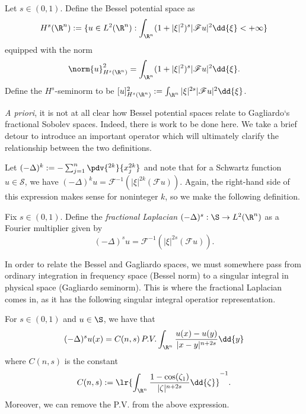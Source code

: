 \documentclass[../main.tex]{subfiles}
\begin{document}
\begin{definition}
    Let $ s\in (0,1) $. Define the Bessel potential space as
    \[
         H^{s}(\R^{n}) := \{ u\in L^{2}(\R^{n}): \int_{\R^{n}}(1+| \xi|^{2})^{s}|\mathscr{F}u|^{2}\dd{\xi} < +\infty\} 
    \]
    equipped with the norm
    \[
        \norm{u}_{H^{s}(\R^{n})}^{2} = \int_{\R^{n}}(1+| \xi|^{2})^{s}|\mathscr{F}u|^{2}\dd{\xi}.
    \]
    Define the $ H^{s} $-seminorm to be $ [u]_{H^{s}(\R^{n})}^{2}:= \int_{\R^{n}}| \xi|^{2s}|\mathscr{F}u|^{2}\dd{\xi} $. 
\end{definition}

\textit{A priori}, it is not at all clear how Bessel potential spaces relate to Gagliardo`s fractional Sobolev spaces. Indeed, there is work to be done here.
We take a brief detour to introduce an important operator which will ultimately clarify the relationship between the two definitions. 

Let $ (-\Delta)^{k}:= -\sum_{j=1}^{n} \pdv{^{2k}}{x_{j}^{2k}}$ and note that for a Schwartz function $ u\in \mathscr{S} $, we have $ (-\Delta)^{k} u =\mathscr{F}^{-1}( | \xi|^{2k} (\mathscr{F}u)) $. Again, the right-hand side of this expression makes sense for noninteger $ k $, so we make the following definition.
\begin{definition}
    Fix $ s\in (0,1) $. Define the \textit{fractional Laplacian} $ (-\Delta)^{s}:\S\to L^{2}(\R^{n}) $ as a Fourier multiplier given by
    \[
        (-\Delta)^{s}u = \mathscr{F}^{-1} (| \xi|^{2s}( \mathscr{F}u)).
    \]
\end{definition}

In order to relate the Bessel and Gagliardo spaces, we must somewhere pass from ordinary integration in frequency space (Bessel norm) to a singular integral in physical space (Gagliardo seminorm). This is where the fractional Laplacian comes in, as it has the following singular integral operatior representation.

\begin{proposition}\label{laplacianisintegral}
    For $ s\in (0,1) $ and $ u\in \S $, we have that 
    \begin{equation}
        (-\Delta )^{s}u(x) = C(n,s)\, P.V. \int_{\R^{n}} \frac{u(x) - u(y)}{|x-y|^{n+2s}} \dd{y}
    \end{equation}
    where $ C(n,s) $ is the constant 
    \begin{equation}
        C(n,s) := \lr{ \int_{\R^{n}}\frac{1-\cos(\zeta_{1})}{| \zeta|^{n+2s}}\dd{\zeta}  }^{-1}.
    \end{equation}
    Moreover, we can remove the P.V. from the above expression.
\end{proposition}
\end{document}
